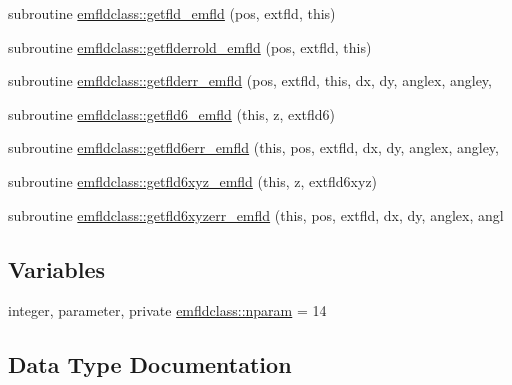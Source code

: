 \begin{DoxyCompactItemize}
\item 
subroutine \mbox{\hyperlink{namespaceemfldclass_aa0023b4b2c7a17c75becc20eeb9be23c}{emfldclass\+::getfld\+\_\+emfld}} (pos, extfld, this)
\item 
subroutine \mbox{\hyperlink{namespaceemfldclass_a828e010a02ef4b8d9806f8d4c3053126}{emfldclass\+::getflderrold\+\_\+emfld}} (pos, extfld, this)
\item 
subroutine \mbox{\hyperlink{namespaceemfldclass_ad7628b9fdaf5e839e55f71c3f8678c11}{emfldclass\+::getflderr\+\_\+emfld}} (pos, extfld, this, dx, dy, anglex, angley,
\item 
subroutine \mbox{\hyperlink{namespaceemfldclass_a7eb67a0a1ce6ea3f37b4c55e40048f4a}{emfldclass\+::getfld6\+\_\+emfld}} (this, z, extfld6)
\item 
subroutine \mbox{\hyperlink{namespaceemfldclass_ab5c872006557986fafd6080666ca68f1}{emfldclass\+::getfld6err\+\_\+emfld}} (this, pos, extfld, dx, dy, anglex, angley,
\item 
subroutine \mbox{\hyperlink{namespaceemfldclass_a6a4833c66a8430fe7d7c3e005dd34c6e}{emfldclass\+::getfld6xyz\+\_\+emfld}} (this, z, extfld6xyz)
\item 
subroutine \mbox{\hyperlink{namespaceemfldclass_a53a2dd6514711afd20442dab5686c5a4}{emfldclass\+::getfld6xyzerr\+\_\+emfld}} (this, pos, extfld, dx, dy, anglex, angl
\end{DoxyCompactItemize}
\subsection*{Variables}
\begin{DoxyCompactItemize}
\item 
integer, parameter, private \mbox{\hyperlink{namespaceemfldclass_ad6fed90f4153b92a9a9ff35a6ef146c3}{emfldclass\+::nparam}} = 14
\end{DoxyCompactItemize}


\subsection{Data Type Documentation}
\label{structemfldclass_1_1emfld}
